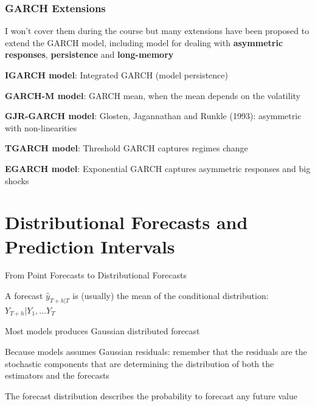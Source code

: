 \documentclass{beamer}
\newenvironment{wideitemize}{\itemize\addtolength{\itemsep}{10pt}}{\enditemize}
\begin{document}
\begin{frame}
  \frametitle{GARCH Extensions}
  \begin{wideitemize}
  \item I won't cover them during the course but many extensions have been proposed to extend the GARCH model, including model for dealing with \textbf{asymmetric responses}, \textbf{persistence} and \textbf{long-memory}
    \begin{wideitemize}
      \item \textbf{IGARCH model}: Integrated GARCH (model persistence)
      \item \textbf{GARCH-M model}: GARCH mean, when the mean depends on the volatility
      \item \textbf{GJR-GARCH model}: Glosten, Jagannathan and Runkle (1993): asymmetric with non-linearities
      \item \textbf{TGARCH model}: Threshold GARCH captures regimes change
      \item \textbf{EGARCH model}: Exponential GARCH captures asymmetric responses and big shocks
    \end{wideitemize}
  \end{wideitemize}
\end{frame}

\section{Distributional Forecasts and Prediction Intervals}
\begin{frame}{From Point Forecasts to Distributional Forecasts}

  \begin{wideitemize}
    \item A forecast $\hat{y}_{T+h|T}$ is (usually) the mean of the conditional distribution: $Y_{T+h} | Y_1, \dots Y_T$
    \item Most models produces Gaussian distributed forecast
    \item Because models assumes Gaussian residuals: remember that the residuals are the stochastic components that are determining the distribution of both the estimators and the forecasts
    \item The forecast distribution describes the probability to forecast any future value
  \end{wideitemize}

    
\end{frame}
\end{document}
